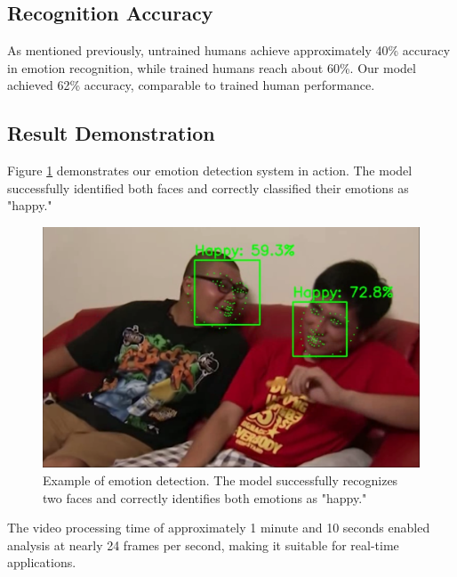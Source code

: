 \subsection{Recognition Accuracy}
As mentioned previously, untrained humans achieve approximately 40\% accuracy in emotion recognition, while trained humans reach about 60\%. Our model achieved 62\% accuracy, comparable to trained human performance.

\subsection{Result Demonstration}
Figure \ref{fig:jg_exp} demonstrates our emotion detection system in action. The model successfully identified both faces and correctly classified their emotions as "happy."

\begin{figure}[!htb]
	\centering
	 \includegraphics[width=0.8\linewidth]{sec/assets/jg_exp.png}
	 \caption{Example of emotion detection. The model successfully recognizes two faces and correctly identifies both emotions as "happy."}
	 \label{fig:jg_exp}
\end{figure}

The video processing time of approximately 1 minute and 10 seconds enabled analysis at nearly 24 frames per second, making it suitable for real-time applications.

